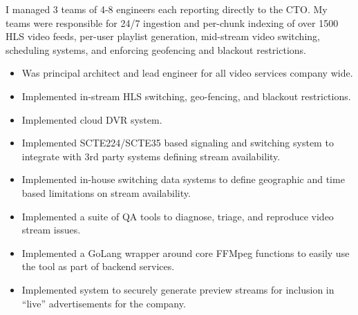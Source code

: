 \documentclass{article}
\begin{document}
\vspace{3pt} I managed 3 teams of 4-8 engineers each reporting directly to the CTO. My teams were responsible for 24/7 ingestion and per-chunk indexing of
over 1500 HLS video feeds, per-user playlist generation, mid-stream video switching, scheduling systems, and enforcing geofencing and blackout restrictions. 
\vspace{3pt}\begin{multicols}{2}
  \begin{small}
    \begin{itemize}[leftmargin=*,label=\tiny{$\bullet$}]
    \item\begin{minipage}[t]{\linewidth}{Was principal architect and lead engineer for all video services company wide.}\end{minipage}
    \item\begin{minipage}[t]{\linewidth}{Implemented in-stream HLS switching, geo-fencing, and blackout restrictions.}\end{minipage}
    \item\begin{minipage}[t]{\linewidth}{Implemented cloud DVR system.}\end{minipage}
    \item\begin{minipage}[t]{\linewidth}{Implemented SCTE224/SCTE35 based signaling and switching system to integrate with 3rd party systems defining stream availability.}\end{minipage}
    \item\begin{minipage}[t]{\linewidth}{Implemented in-house switching data systems to define geographic and time based limitations on stream availability.}\end{minipage}
    \item\begin{minipage}[t]{\linewidth}{Implemented a suite of QA tools to diagnose, triage, and reproduce video stream issues.}\end{minipage}
    \item\begin{minipage}[t]{\linewidth}{Implemented a GoLang wrapper around core FFMpeg functions to easily use the tool as part of backend services.}\end{minipage}
    \item\begin{minipage}[t]{\linewidth}{Implemented system to securely generate preview streams for inclusion in ``live'' advertisements for the company.}\end{minipage}

\end{itemize}
\end{small}
\end{multicols}
\end{document}
